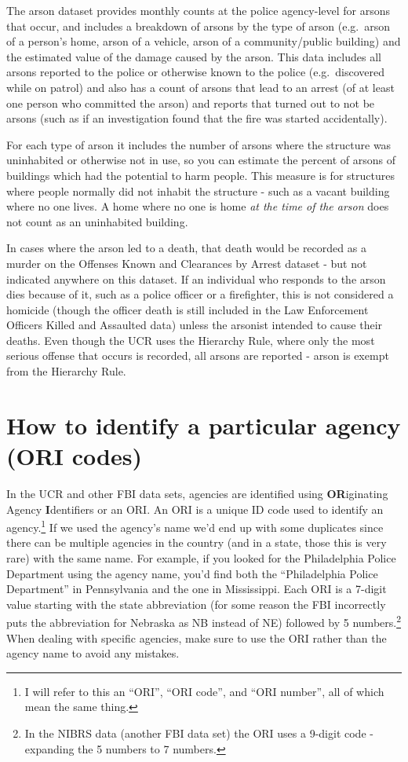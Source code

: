\documentclass[
  12pt,
  openany]{book}
\begin{document}
The arson dataset provides monthly counts at the police agency-level for arsons that occur, and includes a breakdown of arsons by the type of arson (e.g.~arson of a person's home, arson of a vehicle, arson of a community/public building) and the estimated value of the damage caused by the arson. This data includes all arsons reported to the police or otherwise known to the police (e.g.~discovered while on patrol) and also has a count of arsons that lead to an arrest (of at least one person who committed the arson) and reports that turned out to not be arsons (such as if an investigation found that the fire was started accidentally).

For each type of arson it includes the number of arsons where the structure was uninhabited or otherwise not in use, so you can estimate the percent of arsons of buildings which had the potential to harm people. This measure is for structures where people normally did not inhabit the structure - such as a vacant building where no one lives. A home where no one is home \emph{at the time of the arson} does not count as an uninhabited building.

In cases where the arson led to a death, that death would be recorded as a murder on the Offenses Known and Clearances by Arrest dataset - but not indicated anywhere on this dataset. If an individual who responds to the arson dies because of it, such as a police officer or a firefighter, this is not considered a homicide (though the officer death is still included in the Law Enforcement Officers Killed and Assaulted data) unless the arsonist intended to cause their deaths. Even though the UCR uses the Hierarchy Rule, where only the most serious offense that occurs is recorded, all arsons are reported - arson is exempt from the Hierarchy Rule.

\hypertarget{how-to-identify-a-particular-agency-ori-codes}{%
\section{How to identify a particular agency (ORI codes)}\label{how-to-identify-a-particular-agency-ori-codes}}

In the UCR and other FBI data sets, agencies are identified using \textbf{OR}iginating Agency \textbf{I}dentifiers or an ORI. An ORI is a unique ID code used to identify an agency.\footnote{I will refer to this an ``ORI'', ``ORI code'', and ``ORI number'', all of which mean the same thing.} If we used the agency's name we'd end up with some duplicates since there can be multiple agencies in the country (and in a state, those this is very rare) with the same name. For example, if you looked for the Philadelphia Police Department using the agency name, you'd find both the ``Philadelphia Police Department'' in Pennsylvania and the one in Mississippi. Each ORI is a 7-digit value starting with the state abbreviation (for some reason the FBI incorrectly puts the abbreviation for Nebraska as NB instead of NE) followed by 5 numbers.\footnote{In the NIBRS data (another FBI data set) the ORI uses a 9-digit code - expanding the 5 numbers to 7 numbers.} When dealing with specific agencies, make sure to use the ORI rather than the agency name to avoid any mistakes.
\end{document}
